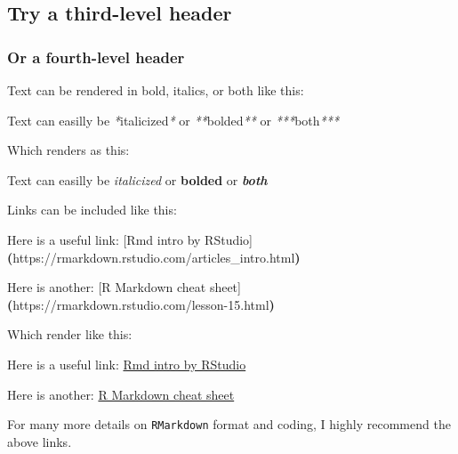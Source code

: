 \documentclass[
]{book}
\newenvironment{Shaded}{\begin{snugshade}}{\end{snugshade}}
\newcommand{\ErrorTok}[1]{\textcolor[rgb]{0.64,0.00,0.00}{\textbf{#1}}}
\newcommand{\ExtensionTok}[1]{#1}
\newcommand{\KeywordTok}[1]{\textcolor[rgb]{0.13,0.29,0.53}{\textbf{#1}}}
\newcommand{\NormalTok}[1]{#1}
\newcommand{\PreprocessorTok}[1]{\textcolor[rgb]{0.56,0.35,0.01}{\textit{#1}}}
\begin{document}
\hypertarget{try-a-third-level-header}{%
\subsection{Try a third-level header}\label{try-a-third-level-header}}

\hypertarget{or-a-fourth-level-header}{%
\subsubsection{Or a fourth-level header}\label{or-a-fourth-level-header}}

Text can be rendered in bold, italics, or both like this:

\begin{Shaded}
\begin{Highlighting}[]
\ExtensionTok{Text}\NormalTok{ can easilly be }\PreprocessorTok{*}\NormalTok{italicized}\PreprocessorTok{*}\NormalTok{ or }\PreprocessorTok{**}\NormalTok{bolded}\PreprocessorTok{**}\NormalTok{ or }\PreprocessorTok{***}\NormalTok{both}\PreprocessorTok{***}
\end{Highlighting}
\end{Shaded}

Which renders as this:

Text can easilly be \emph{italicized} or \textbf{bolded} or \textbf{\emph{both}}

Links can be included like this:

\begin{Shaded}
\begin{Highlighting}[]
\ExtensionTok{Here}\NormalTok{ is a useful link: [Rmd intro by RStudio]}\ErrorTok{(}\ExtensionTok{https://rmarkdown.rstudio.com/articles\_intro.html}\KeywordTok{)}

\ExtensionTok{Here}\NormalTok{ is another: [R Markdown cheat sheet]}\ErrorTok{(}\ExtensionTok{https://rmarkdown.rstudio.com/lesson{-}15.html}\KeywordTok{)}
\end{Highlighting}
\end{Shaded}

Which render like this:

Here is a useful link: \href{https://rmarkdown.rstudio.com/articles_intro.html}{Rmd intro by RStudio}

Here is another: \href{https://rmarkdown.rstudio.com/lesson-15.html}{R Markdown cheat sheet}

For many more details on \texttt{RMarkdown} format and coding, I highly recommend the above links.
\end{document}

